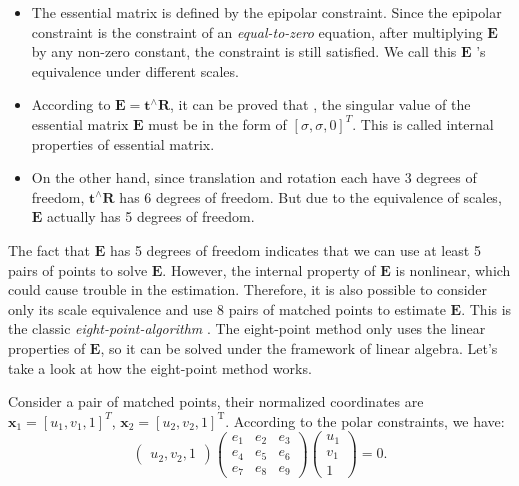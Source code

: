 \begin{itemize}
	\item The essential matrix is defined by the epipolar constraint. Since the epipolar constraint is the constraint of an\textit{ equal-to-zero }equation, after multiplying $\mathbf{E}$ by any non-zero constant, the constraint is still satisfied. We call this $\mathbf{E}$ 's equivalence under different scales.
	\item According to $\mathbf{E} = \mathbf{t}^ \wedge \mathbf{R}$, it can be proved that  {\cite{Hartley2003}}, the singular value of the essential matrix $\mathbf{E}$ must be in the form of $[\sigma, \sigma, 0]^T$. This is called internal properties of essential matrix.
	\item On the other hand, since translation and rotation each have 3 degrees of freedom, $\mathbf{t}^\wedge \mathbf{R}$ has 6 degrees of freedom. But due to the equivalence of scales, $\mathbf{E}$ actually has 5 degrees of freedom.
\end{itemize}

The fact that $\mathbf{E}$ has 5 degrees of freedom indicates that we can use at least 5 pairs of points to solve $\mathbf{E}$. However, the internal property of $\mathbf{E}$ is nonlinear, which could cause trouble in the estimation. Therefore, it is also possible to consider only its scale equivalence and use 8 pairs of matched points to estimate $\mathbf{E}$. This is the classic \textit{eight-point-algorithm} {\cite{Hartley1997, Longuet-Higgins1987}}. The eight-point method only uses the linear properties of $\mathbf{E}$, so it can be solved under the framework of linear algebra. Let's take a look at how the eight-point method works.

Consider a pair of matched points, their normalized coordinates are $\mathbf{x}_{1}=[u_{1},v_{1},1]^T$, $\mathbf{x}_{2}=[u_{2},v_{2},1]^{\mathrm{T}}$. According to the polar constraints, we have:
\begin{equation}
\begin{pmatrix} 
u_{2},v_{2},1
\end{pmatrix}
\begin{pmatrix}
 e_{1} & e_{2} & e_{3}\\ 
 e_{4} & e_{5} & e_{6}\\ 
 e_{7} & e_{8} & e_{9} 
\end{pmatrix}
\begin{pmatrix} 
u_{1}\\v_{1}\\1
\end{pmatrix}
=0.
\end{equation}

